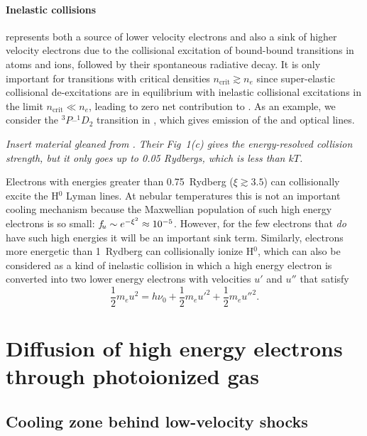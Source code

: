 \documentclass{emulateapj}
\begin{document}
\paragraph{Inelastic collisions}  represents both a
source of lower velocity electrons and also a sink of higher velocity
electrons due to the collisional excitation of bound-bound transitions
in atoms and ions, followed by their spontaneous radiative decay.  It
is only important for transitions with critical densities
\(n_{\mathrm{crit}} \gtrsim n_e\)
since super-elastic collisional de-excitations are in equilibrium with
inelastic collisional excitations in the limit
\(n_{\mathrm{crit}} \ll n_e\),
leading to zero net contribution to .  As an example,
we consider the \({}^3P\)--\({}^1D_2\)
transition in \oiii{}, which gives emission of the  and
 optical lines.

\textit{Insert material gleaned from \citet{Storey:2014a}.  Their
  Fig~1(c) gives the energy-resolved collision strength, but it only
  goes up to 0.05 Rydbergs, which is less than \(kT \).
}

Electrons with energies greater than 0.75~Rydberg (\(\xi \gtrsim
3.5\)) can collisionally excite the H\(^0\) Lyman lines.  At nebular
temperatures this is not an important cooling mechanism because the
Maxwellian population of such high energy electrons is so small: \(f_{\!u}
\sim e^{-\xi^2} \approx 10^{-5}\).  However, for the few electrons that
\emph{do} have such high energies it will be an important sink term.
Similarly, electrons more energetic than 1~Rydberg can collisionally
ionize H\(^0\), which can also be considered as a kind of inelastic
collision in which a high energy electron is converted into two lower
energy electrons with velocities \(u'\) and \(u''\) that satisfy 
\begin{equation}
  \label{eq:12}
  \frac12 m_e u^2 = h\nu_0 + \frac12 m_e u'^2 + \frac12 m_e u''^2 .
\end{equation}
 



\section{Diffusion of high energy electrons through photoionized gas}
\label{sec:diff-high-energy}


\subsection{Cooling zone behind low-velocity shocks}
\label{sec:cooling-zone-behind}
\end{document}
